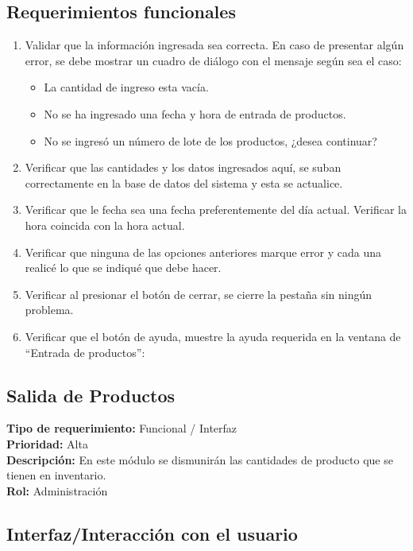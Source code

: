 \documentclass[a4paper,DIV=12]{scrreprt}
\begin{document}
\subsection*{Requerimientos funcionales}
\begin{enumerate}
	\item{Validar que la información ingresada sea correcta. En caso de presentar algún error, se debe mostrar un cuadro de diálogo con el mensaje según sea el caso:}
	\begin{itemize}
		\item{La cantidad de ingreso esta vacía.}
		\item{No se ha ingresado una fecha y hora de entrada de productos.}
		\item{No se ingresó un número de lote de los productos, ¿desea continuar?}
	\end{itemize}
	\item{Verificar que las cantidades y los datos ingresados aquí, se suban correctamente en la base de datos del sistema y esta se actualice.}	
	\item{Verificar que le fecha sea una fecha preferentemente del día actual. Verificar la hora coincida con la hora actual.}
	\item{Verificar que ninguna de las opciones anteriores marque error y cada una realicé lo que se indiqué que debe hacer.}
	\item{Verificar al presionar el botón de cerrar, se cierre la pestaña sin ningún problema.}
	\item{Verificar que el botón de ayuda, muestre la ayuda requerida en la ventana de “Entrada de productos”:}	
			
\end{enumerate}


\newpage
\setcounter{subsection}{-1}
\setcounter{chapter}{1}
\setcounter{section}{5}
\subsection{Salida de Productos}
\noindent
\textbf{Tipo de requerimiento:} Funcional / Interfaz\\
\textbf{Prioridad:} Alta\\
\textbf{Descripción:} En este módulo se dismunirán las cantidades de producto que se tienen en inventario.\\
\textbf{Rol:} Administración\\
\subsection*{Interfaz/Interacción con el usuario}
\end{document}
